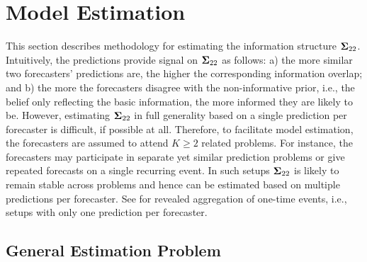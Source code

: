 \documentclass[11pt]{article}
\theoremstyle{definition}
\theoremstyle{definition}
\def\bSigma{{\bf \Sigma}}
\begin{document}
\section{Model Estimation}
\label{estimator}
This section describes methodology for estimating the information structure $\bSigma_{22}$.  Intuitively, the predictions provide signal on $\bSigma_{22}$ as follows: a) the more similar two forecasters' predictions are, the higher the corresponding information overlap; and b) the more the forecasters disagree with the non-informative prior, i.e., the belief only reflecting the basic information, the more informed they are likely to be. 
However, estimating $\bSigma_{22}$ in full generality based on a single prediction per forecaster is difficult, if possible at all. Therefore, to facilitate model estimation, the forecasters are assumed to attend $K \geq 2$ related problems. For instance, the forecasters may participate in separate yet similar prediction problems or give repeated forecasts on a single recurring event. In such setups $\bSigma_{22}$ is likely to remain stable across problems and hence can be estimated based on multiple predictions per forecaster. See \cite{satopaamodeling} for revealed aggregation of one-time events, i.e., setups with only one prediction per forecaster. 








\subsection{General Estimation Problem}
\label{generalEstimation}
\end{document}
